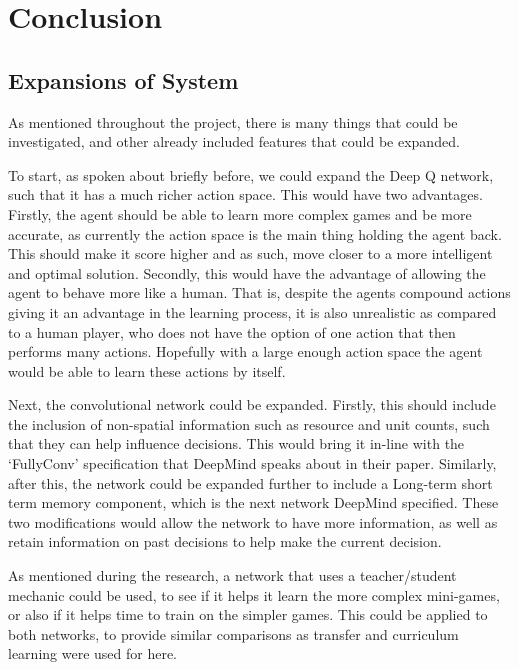 \chapter{Conclusion}%
\label{conclusion}

\section{Expansions of System}

As mentioned throughout the project, there is many things that could be
investigated, and other already included features that could be expanded.

To start, as spoken about briefly before, we could expand the Deep Q network,
such that it has a much richer action space. This would have two advantages.
Firstly, the agent should be able to learn more complex games and be more
accurate, as currently the action space is the main thing holding the agent
back. This should make it score higher and as such, move closer to a more
intelligent and optimal solution. Secondly, this would have the advantage of
allowing the agent to behave more like a human. That is, despite the agents
compound actions giving it an advantage in the learning process, it is also
unrealistic as compared to a human player, who does not have the option of one
action that then performs many actions. Hopefully with a large enough action
space the agent would be able to learn these actions by itself.

Next, the convolutional network could be expanded. Firstly, this should include
the inclusion of non-spatial information such as resource and unit counts, such
that they can help influence decisions. This would bring it in-line with the
`FullyConv' specification that DeepMind speaks about in their paper. Similarly,
after this, the network could be expanded further to include a Long-term short
term memory component, which is the next network DeepMind specified. These two
modifications would allow the network to have more information, as well as
retain information on past decisions to help make the current decision.

As mentioned during the research, a network that uses a teacher/student mechanic
could be used, to see if it helps it learn the more complex mini-games, or also
if it helps time to train on the simpler games. This could be applied to both
networks, to provide similar comparisons as transfer and curriculum learning were
used for here.

